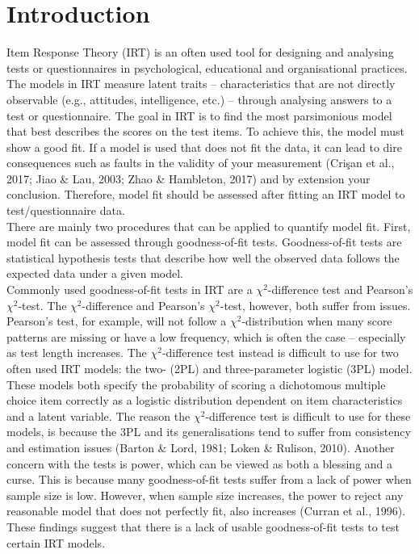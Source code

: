 \documentclass[Royal,sageapa,times,doublespace]{sagej}
\begin{document}
\section{Introduction}
Item Response Theory (IRT) is an often used tool for designing and analysing tests or questionnaires in psychological, educational and organisational practices. The models in IRT measure latent traits -- characteristics that are not directly observable (e.g., attitudes, intelligence, etc.) -- through analysing answers to a test or questionnaire. The goal in IRT is to find the most parsimonious model that best describes the scores on the test items. To achieve this, the model must show a good fit. If a model is used that does not fit the data, it can lead to dire consequences such as faults in the validity of your measurement (Cri\c{s}an et al., 2017; Jiao \& Lau, 2003; Zhao \& Hambleton, 2017) and by extension your conclusion. Therefore, model fit should be assessed after fitting an IRT model to test/questionnaire data. \\
\indent There are mainly two procedures that can be applied to quantify model fit. First, model fit can be assessed through goodness-of-fit tests. Goodness-of-fit tests are statistical hypothesis tests that describe how well the observed data follows the expected data under a given model. \\
\indent Commonly used goodness-of-fit tests in IRT are a $\chi^2$-difference test and Pearson's $\chi^2$-test. The $\chi^2$-difference and Pearson's $\chi^2$-test, however, both suffer from issues. Pearson's test, for example, will not follow a $\chi^2$-distribution when many score patterns are missing or have a low frequency, which is often the case -- especially as test length increases. The $\chi^2$-difference test instead is difficult to use for two often used IRT models: the two- (2PL) and three-parameter logistic (3PL) model. These models both specify the probability of scoring a dichotomous multiple choice item correctly as a logistic distribution dependent on item characteristics and a latent variable. The reason the $\chi^2$-difference test is difficult to use for these models, is because the 3PL and its generalisations tend to suffer from consistency and estimation issues (Barton \& Lord, 1981; Loken \& Rulison, 2010). Another concern with the tests is power, which can be viewed as both a blessing and a curse. This is because many goodness-of-fit tests suffer from a lack of power when sample size is low. However, when sample size increases, the power to reject any reasonable model that does not perfectly fit, also increases (Curran et al., 1996). These findings suggest that there is a lack of usable goodness-of-fit tests to test certain IRT models. \\
\end{document}
